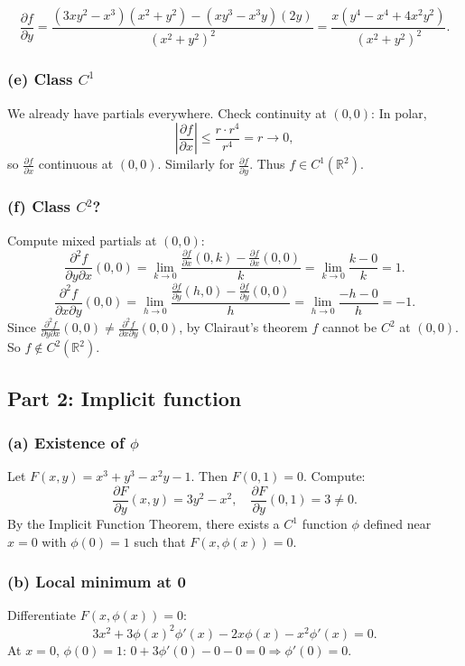 \documentclass[12pt]{article}
\begin{document}
\begin{answerbox}
\[
\frac{\partial f}{\partial y}= \frac{(3xy^2-x^3)(x^2+y^2) - (xy^3-x^3y)(2y)}{(x^2+y^2)^2}
= \frac{x(y^4 - x^4 + 4x^2y^2)}{(x^2+y^2)^2}.
\]

\subsubsection*{(e) Class \(C^1\)}
We already have partials everywhere. Check continuity at \((0,0)\): In polar,
\[
\left|\frac{\partial f}{\partial x}\right| \leq \frac{r\cdot r^4}{r^4} = r \to 0,
\]
so \(\frac{\partial f}{\partial x}\) continuous at \((0,0)\). Similarly for \(\frac{\partial f}{\partial y}\). Thus \(f\in C^1(\mathbb{R}^2)\).

\subsubsection*{(f) Class \(C^2\)?}
Compute mixed partials at \((0,0)\):
\[
\frac{\partial^2 f}{\partial y\partial x}(0,0)=\lim_{k\to0}\frac{\frac{\partial f}{\partial x}(0,k)-\frac{\partial f}{\partial x}(0,0)}{k}
=\lim_{k\to0}\frac{k-0}{k}=1.
\]
\[
\frac{\partial^2 f}{\partial x\partial y}(0,0)=\lim_{h\to0}\frac{\frac{\partial f}{\partial y}(h,0)-\frac{\partial f}{\partial y}(0,0)}{h}
=\lim_{h\to0}\frac{-h-0}{h}=-1.
\]
Since \(\frac{\partial^2 f}{\partial y\partial x}(0,0)\neq\frac{\partial^2 f}{\partial x\partial y}(0,0)\), by Clairaut's theorem \(f\) cannot be \(C^2\) at \((0,0)\). So \(f\notin C^2(\mathbb{R}^2)\).

\subsection*{Part 2: Implicit function}

\subsubsection*{(a) Existence of \(\phi\)}
Let \(F(x,y)=x^3+y^3-x^2y-1\). Then \(F(0,1)=0\). Compute:
\[
\frac{\partial F}{\partial y}(x,y)=3y^2-x^2, \quad \frac{\partial F}{\partial y}(0,1)=3\neq0.
\]
By the Implicit Function Theorem, there exists a \(C^1\) function \(\phi\) defined near \(x=0\) with \(\phi(0)=1\) such that \(F(x,\phi(x))=0\).

\subsubsection*{(b) Local minimum at 0}
Differentiate \(F(x,\phi(x))=0\):
\[
3x^2+3\phi(x)^2\phi'(x)-2x\phi(x)-x^2\phi'(x)=0.
\]
At \(x=0\), \(\phi(0)=1\): \(0+3\phi'(0)-0-0=0 \Rightarrow \phi'(0)=0\).


\end{answerbox}
\end{document}
